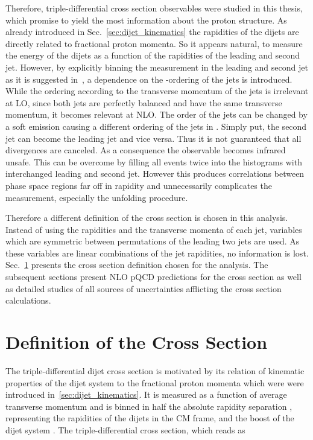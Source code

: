 Therefore, triple-differential cross section observables were studied in this
thesis, which promise to yield the most information about the proton structure.
As already introduced in Sec.~\ref{sec:dijet_kinematics} the rapidities of the
dijets are directly related to fractional proton momenta. So it appears natural,
to measure the energy of the dijets as a function of the rapidities of the
leading and second jet. However, by explicitly binning the measurement in the
leading and second jet as it is suggested in~\cite{Giele:1994xd}, a dependence
on the \pt-ordering of the jets is introduced. While the ordering according to the
transverse momentum of the jets is irrelevant at LO, since both jets are
perfectly balanced and have the same transverse momentum, it becomes relevant at
NLO. The order of the jets can be changed by a soft emission causing a different
ordering of the jets in \pt. Simply put, the second jet can become the leading
jet and vice versa. Thus it is not guaranteed that all divergences are canceled.
As a consequence the observable becomes infrared unsafe. This can be overcome by
filling all events twice into the histograms with interchanged leading and
second jet. However this produces correlations between phase space regions far
off in rapidity and unnecessarily complicates the measurement, especially the
unfolding procedure.

Therefore a different definition of the cross section is chosen in this
analysis. Instead of using the rapidities and the transverse momenta of each
jet, variables which are symmetric between permutations of the leading two
jets are used. As these variables are linear combinations of the jet rapidities,
no information is lost. Sec.~\ref{sec:crosssection_definition} presents the
cross section definition chosen for the analysis. The subsequent sections  present
NLO pQCD predictions for the cross section as well as detailed studies of all
sources of uncertainties afflicting the cross section calculations.

\section{Definition of the Cross Section}
\label{sec:crosssection_definition}

The triple-differential dijet cross section is motivated by its relation of
kinematic properties of the dijet system to the fractional proton momenta which
were were introduced in~\ref{sec:dijet_kinematics}. It is measured as a function
of average transverse momentum \ptavg and is binned in half the absolute
rapidity separation \ystar, representing the rapidities of the dijets in the CM
frame, and the boost of the dijet system \yboost. The triple-differential cross
section, which reads as

